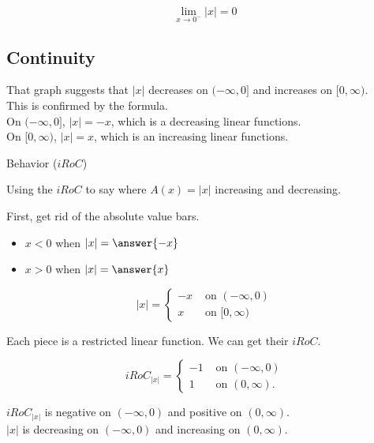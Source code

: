 \documentclass{ximera}
\begin{document}
\[
\lim\limits_{x \to 0^-} |x| = 0
\]












\subsection*{Continuity}


That graph suggests that $|x|$ decreases on $(-\infty, 0]$  and  increases on $[0, \infty )$.  \\

This is confirmed by the formula. \\


On $(-\infty, 0]$, $|x| = -x$, which is a decreasing linear functions. \\


On $[0, \infty)$, $|x| = x$, which is an increasing linear functions. \\


\begin{example}  Behavior ($iRoC$)


Using the $iRoC$ to say where $A(x) = | x |$ increasing and decreasing. \\



\begin{explanation}


First, get rid of the absolute value bars.

\begin{itemize}
\item $x < 0$ when $|x| = \answer{-x}$
\item $x > 0$ when $|x| = \answer{x}$
\end{itemize}



\[
|x| = 
\begin{cases}
  -x & \text{ on } (-\infty, 0)   \\
  x  & \text{ on } [0, \infty)
\end{cases}
\]



Each piece is a restricted linear function.  We can get their $iRoC$.


\[
iRoC_{|x|} = 
\begin{cases}
  -1 & \text{ on } (-\infty, 0)   \\
  1  & \text{ on } (0, \infty).
\end{cases}
\]

$iRoC_{|x|}$ is negative on $(-\infty, 0)$ and positive on $(0, \infty)$. \\


$| x |$ is decreasing on $(-\infty, 0)$ and increasing on $(0, \infty)$.



\end{explanation}


\end{example}
\end{document}
